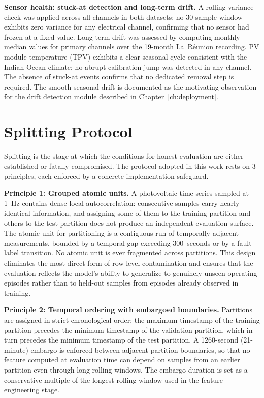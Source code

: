 \textbf{Sensor health: stuck-at detection and long-term drift.} A rolling variance check was applied across all channels in both datasets: no 30-sample window exhibits zero variance for any electrical channel, confirming that no sensor had frozen at a fixed value. Long-term drift was assessed by computing monthly median values for primary channels over the 19-month La~Réunion recording. PV module temperature (TPV) exhibits a clear seasonal cycle consistent with the Indian Ocean climate; no abrupt calibration jump was detected in any channel. The absence of stuck-at events confirms that no dedicated removal step is required. The smooth seasonal drift is documented as the motivating observation for the drift detection module described in Chapter~\ref{ch:deployment}.

\section{Splitting Protocol}
\label{sec:splitting}

Splitting is the stage at which the conditions for honest evaluation are either established or fatally compromised. The protocol adopted in this work rests on 3 principles, each enforced by a concrete implementation safeguard.

\textbf{Principle 1: Grouped atomic units.} A photovoltaic time series sampled at 1~Hz contains dense local autocorrelation: consecutive samples carry nearly identical information, and assigning some of them to the training partition and others to the test partition does not produce an independent evaluation surface. The atomic unit for partitioning is a contiguous run of temporally adjacent measurements, bounded by a temporal gap exceeding 300~seconds or by a fault label transition. No atomic unit is ever fragmented across partitions. This design eliminates the most direct form of row-level contamination and ensures that the evaluation reflects the model's ability to generalize to genuinely unseen operating episodes rather than to held-out samples from episodes already observed in training.

\textbf{Principle 2: Temporal ordering with embargoed boundaries.} Partitions are assigned in strict chronological order: the maximum timestamp of the training partition precedes the minimum timestamp of the validation partition, which in turn precedes the minimum timestamp of the test partition. A 1260-second (21-minute) embargo is enforced between adjacent partition boundaries, so that no feature computed at evaluation time can depend on samples from an earlier partition even through long rolling windows. The embargo duration is set as a conservative multiple of the longest rolling window used in the feature engineering stage.

